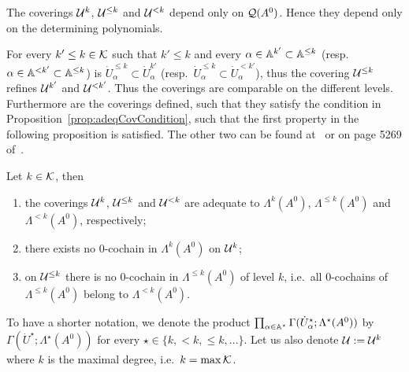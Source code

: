 \begin{rem}
  The coverings $\mathcal{U}^{k}$, $\mathcal{U}^{\leq k}$ and $\mathcal{U}^{<k}$ depend only on
  $\mathcal{Q}(A^0)$. Hence they depend only on the determining polynomials.
\end{rem}
For every $k'\leq k\in\mathcal{K}$ such that $k'\leq k$ and every
$\alpha\in\mathbb{A}^{k'}\subset\mathbb{A}^{\leq k}$ (resp.\
$\alpha\in\mathbb{A}^{<k'}\subset\mathbb{A}^{\leq k}$) is
$\dot U^{\leq k}_\alpha\subset\dot U^{k'}_\alpha$ (resp.\
$\dot U^{\leq k}_\alpha\subset\dot U^{<k'}_\alpha$), thus the covering
$\mathcal{U}^{\leq k}$ refines $\mathcal{U}^{k'}$ and $\mathcal{U}^{<k'}$.
Thus the coverings are comparable on the different levels.
Furthermore are the coverings defined, such that they satisfy the
condition in Proposition~\ref{prop:adeqCovCondition}, such that the first
property in the following proposition is satisfied. The other two can be found
at~\cite[Prop.II.3.1 (iv)]{Loday1994} or on page 5269 of~\cite{Loday2004}.
\begin{prop}\label{prop:adequateProperties}
  \marginnote{\cite[Prop.II.3.1]{Loday1994}}
  \PROBLEM[Was bedeutet das?]
  Let $k\in\mathcal{K}$, then
  \begin{enumerate}
    \item the coverings $\mathcal{U}^{k}$, $\mathcal{U}^{\leq k}$ and $\mathcal{U}^{<k}$ are adequate
      to $\Lambda^k(A^0)$, $\Lambda^{\leq k}(A^0)$ and $\Lambda^{<k}(A^0)$, respectively;
    \item there exists no $0$-cochain in $\Lambda^k(A^0)$ on $\mathcal{U}^k$;
    \item on $\mathcal{U}^{\leq k}$ there is no $0$-cochain in $\Lambda^{\leq k}(A^0)$
      of level $k$, i.e.\ all $0$-cochains of $\Lambda^{\leq k}(A^0)$ belong to
      $\Lambda^{<k}(A^0)$.
  \end{enumerate}
\end{prop}
To have a shorter notation, we denote the product
$\prod_{\alpha\in\mathbb{A}^\star}\Gamma(\dot U_\alpha^\star;\Lambda^\star(A^0))$ by
$\Gamma(\dot U^\star;\Lambda^\star(A^0))$ for every
$\star\in\{k,<k,\leq k,\dots\}$.
Let us also denote $\mathcal{U}:=\mathcal{U}^k$ where $k$ is the maximal degree, i.e.\
$k=\max\mathcal{K}$.

